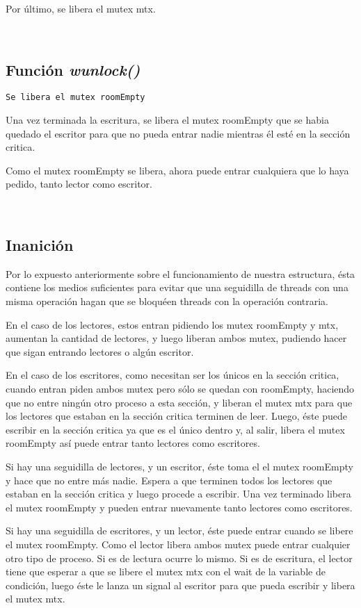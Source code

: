 Por último, se libera el mutex mtx.

~
\subsection{Función \textit{wunlock()}}

\begin{lstlisting}
Se libera el mutex roomEmpty
\end{lstlisting}

Una vez terminada la escritura, se libera el mutex roomEmpty que se habia quedado el escritor para que no pueda entrar nadie mientras él esté en la sección critica.

Como el mutex roomEmpty se libera, ahora puede entrar cualquiera que lo haya pedido, tanto lector como escritor.


~
\subsection{Inanición}

Por lo expuesto anteriormente sobre el funcionamiento de nuestra estructura, ésta contiene los medios suficientes para evitar que una seguidilla de threads con una misma operación hagan que se bloquéen threads con la operación contraria.

En el caso de los lectores, estos entran pidiendo los mutex roomEmpty y mtx, aumentan la cantidad de lectores, y luego liberan ambos mutex, pudiendo hacer que sigan entrando lectores o algún escritor.

En el caso de los escritores, como necesitan ser los únicos en la sección critica, cuando entran piden ambos mutex pero sólo se quedan con roomEmpty, haciendo que no entre ningún otro proceso a esta sección, y liberan el mutex mtx para que los lectores que estaban en la sección critica terminen de leer. Luego, éste puede escribir en la sección critica ya que es el único dentro y, al salir, libera el mutex roomEmpty así puede entrar tanto lectores como escritores.

Si hay una seguidilla de lectores, y un escritor, éste toma el el mutex roomEmpty y hace que no entre más nadie. Espera a que terminen todos los lectores que estaban en la sección critica y luego procede a escribir. Una vez terminado libera el mutex roomEmpty y pueden entrar nuevamente tanto lectores como escritores.

Si hay una seguidilla de escritores, y un lector, éste puede entrar cuando se libere el mutex roomEmpty. Como el lector libera ambos mutex puede entrar cualquier otro tipo de proceso. Si es de lectura ocurre lo mismo. Si es de escritura, el lector tiene que esperar a que se libere el mutex mtx con el wait de la variable de condición, luego éste le lanza un signal al escritor para que pueda escribir y libera el mutex mtx.

